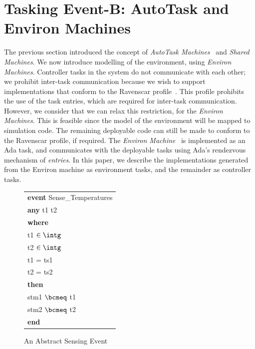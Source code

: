 \section{Tasking Event-B: AutoTask and Environ Machines}\label{EnvironModel}
The previous section introduced the concept of \emph{AutoTask Machines}~  and \emph{Shared Machines}. We now introduce modelling of the environment, using \emph{Environ Machines}. Controller tasks in the system do not communicate with each other; we prohibit inter-task communication because we wish to support implementations that conform to the Ravenscar profile~\cite{Burns1999, ravenspark}. This profile prohibits the use of the task entries, which are required for inter-task communication. However, we consider that we can relax this restriction, for the \emph{Environ Machines}. This is feasible since the model of the environment will be mapped to simulation code. The remaining deployable code can still be made to conform to the Ravenscar profile, if required. The \emph{Environ Machine}~ is implemented as an Ada task, and communicates with the deployable tasks using Ada's rendezvous mechanism of \emph{entries}. In this paper, we describe the implementations generated from the Environ machine as environment tasks, and the remainder as controller tasks.
%
\begin{figure}
\begin{sffamily}
\begin{minipage}{\linewidth}
\begin{center}
\begin{tabular}{l}
\textbf{event} Sense\_Temperatures \\
\quad\textbf{any} t1 t2 \\
\quad\textbf{where} \\
\qquad t1 $\in \intg$ \\
\qquad t2 $\in \intg$ \\
\qquad t1 = ts1 \\
\qquad t2 = ts2 \\
\quad\textbf{then} \\
\qquad stm1 $\bcmeq$ t1 \\
\qquad stm2 $\bcmeq$ t2 \\
\textbf{end}
\end{tabular}
\end{center}
\end{minipage}
\end{sffamily}
	\caption{An Abstract Sensing Event}
	\label{fig:SensingAbsEvent}
\end{figure}

